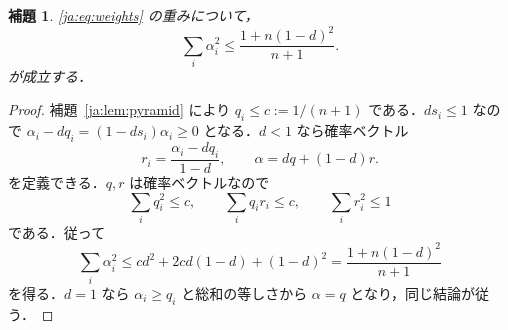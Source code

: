 \documentclass[12pt]{amsart}
\theoremstyle{definition}
\theoremstyle{remark}
\numberwithin{equation}{section}
\theoremstyle{plain}
\newtheorem{jlem}[thm]{補題}
\theoremstyle{definition}
\theoremstyle{remark}
\begin{document}
\begin{jlem}\label{ja:lem:probability}
\eqref{ja:eq:weights} の重みについて，
\begin{equation}\label{ja:eq:sum-squares}
 \sum_i\alpha_i^2\le\frac{1+n(1-d)^2}{n+1}.
\end{equation}
が成立する．
\end{jlem}
\begin{proof}
補題~\ref{ja:lem:pyramid} により $q_i\le c:=1/(n+1)$ である．$ds_i\le1$ なので $\alpha_i-dq_i=(1-ds_i)\alpha_i\ge0$ となる．$d<1$ なら確率ベクトル
\begin{equation}\label{ja:eq:mixture}
 r_i=\frac{\alpha_i-dq_i}{1-d},\qquad
 \alpha=dq+(1-d)r.
\end{equation}
を定義できる．$q,r$ は確率ベクトルなので
\[
\sum_iq_i^2\le c,\qquad \sum_iq_ir_i\le c,\qquad \sum_ir_i^2\le1
\]
である．従って
\[
\sum_i\alpha_i^2
\le cd^2+2cd(1-d)+(1-d)^2=\frac{1+n(1-d)^2}{n+1}
\]
を得る．$d=1$ なら $\alpha_i\ge q_i$ と総和の等しさから $\alpha=q$ となり，同じ結論が従う．
\end{proof}
\end{document}
